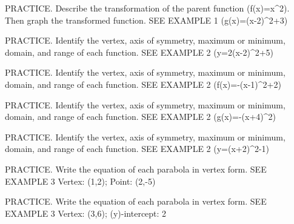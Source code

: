\documentclass{article}
\newenvironment{practice}[2]{}{}        %
\newcommand{\answer}[1]{}               %
\newcommand{\placeholder}[2]{}          %
\begin{document}
\begin{practice}{21}{1}
PRACTICE. Describe the transformation of the parent function (f(x)=x^2). Then graph the transformed function. SEE EXAMPLE 1
(g(x)=(x-2)^2+3)
\answer{The graph of the function is a translation 2 units right and 3 units up with a vertical compression of the graph of (f(x)=x^2).}
\placeholder{graph}{Practice 21 answer: blue curve for (g(x)=\frac{1}{2}(x-2)^2+3), vertex (2,3), y-intercept (0,5), window x=-3 to 7,y=-1 to 10, x labels -2,2,4,6 and y labels 2,4,6,8; gray x,y axes with arrowheads, origin O, unit grid, arrows on both ends of parabola.}
\end{practice}
\begin{practice}{22}{1}
PRACTICE. Identify the vertex, axis of symmetry, maximum or minimum, domain, and range of each function. SEE EXAMPLE 2
(y=2(x-2)^2+5)
\answer{Vertex: (2,5); axis of symmetry: (x=2); minimum: (y=5); domain: (-\infty,\infty); range: [5,\infty)}
\end{practice}
\begin{practice}{23}{1}
PRACTICE. Identify the vertex, axis of symmetry, maximum or minimum, domain, and range of each function. SEE EXAMPLE 2
(f(x)=-(x-1)^2+2)
\answer{Vertex: (1,2); axis of symmetry: (x=1); maximum: (y=2); domain: (-\infty,\infty); range: (-\infty,2]}
\end{practice}
\begin{practice}{24}{1}
PRACTICE. Identify the vertex, axis of symmetry, maximum or minimum, domain, and range of each function. SEE EXAMPLE 2
(g(x)=-(x+4)^2)
\answer{Vertex: (-4,0); axis of symmetry: (x=-4); maximum: (y=0); domain: (-\infty,\infty); range: (-\infty,0]}
\end{practice}
\begin{practice}{25}{1}
PRACTICE. Identify the vertex, axis of symmetry, maximum or minimum, domain, and range of each function. SEE EXAMPLE 2
(y=(x+2)^2-1)
\answer{Vertex: (-2,-1); axis of symmetry: (x=-2); minimum: (y=-1); domain: (-\infty,\infty); range: [-1,\infty)}
\end{practice}
\begin{practice}{26}{1}
PRACTICE. Write the equation of each parabola in vertex form. SEE EXAMPLE 3
Vertex: (1,2); Point: (2,-5)
\answer{(y=-7(x-1)^2+2)}
\end{practice}
\begin{practice}{27}{1}
PRACTICE. Write the equation of each parabola in vertex form. SEE EXAMPLE 3
Vertex: (3,6); (y)-intercept: 2
\answer{(y=-\frac{4}{9}(x-3)^2+6)}
\end{practice}
\end{document}
